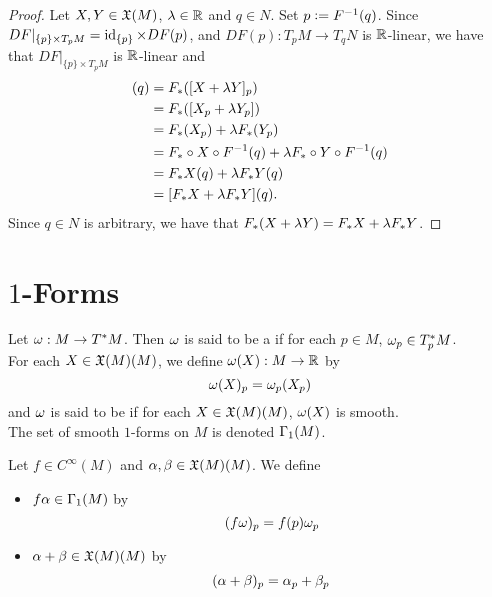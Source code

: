 \documentclass{book}
\begin{document}
\begin{proof}
	Let $X, Y \in \mathfrak{X}(M)$, $\lambda \in \mathbb{R}$ and $q \in N$. Set $p \vcentcolon= F^{-1}(q)$. Since $DF|_{\{p\} \times T_pM} = \operatorname{id}_{\{p\}} \times DF(p)$, and $DF(p): T_pM \rightarrow T_qN$ is $\mathbb{R}$-linear, we have that $DF|_{\{p\} \times T_pM} $ is $\mathbb{R}$-linear and 
	\begin{align*}
		[F_*(X + \lam Y)](q)
		& = F_*([X + \lam Y]_p) \\
		& = F_*([X_p + \lam Y_p]) \\
		& = F_*(X_p) + \lam F_*(Y_p) \\
		& = F_* \circ X \circ F^{-1}(q) + \lam F_* \circ Y \circ F^{-1}(q) \\
		& = F_* X(q) + \lam F_* Y (q) \\
		& = [F_* X + \lam F_* Y](q).
	\end{align*}
	Since $q \in N$ is arbitrary, we have that $F_*(X + \lambda Y) = F_* X + \lambda F_* Y$.
\end{proof}
























\newpage
\section{$1$-Forms}

\begin{defn}
	Let $\omega: M \rightarrow T^*M$. Then $\omega$ is said to be a  if for each $p \in M$, $\omega_p \in T^*_p M$. \\
	For each $X \in \mathfrak{X}(M)(M)$, we define $\omega(X) : M \rightarrow \mathbb{R}$ by $$\omega(X)_p = \omega_p(X_p)$$
	and $\omega$ is said to be  if for each $X \in \mathfrak{X}(M)(M)$, $\omega(X)$ is smooth. \\
	The set of smooth $1$-forms on $M$ is denoted $\Gamma_1(M)$.\\
\end{defn}

\begin{defn}
	Let $f \in C^{\infty}(M)$ and $\alpha,\beta \in \mathfrak{X}(M)(M)$. We define 
	\begin{itemize}
		\item $f\alpha \in \Gamma_1(M)$ by $$(f\omega)_p = f(p)\omega_p$$
		\item $\alpha+\beta \in \mathfrak{X}(M)(M)$ by $$(\alpha+\beta)_p = \alpha_p+\beta_p$$
	\end{itemize}
\end{defn}
\end{document}
